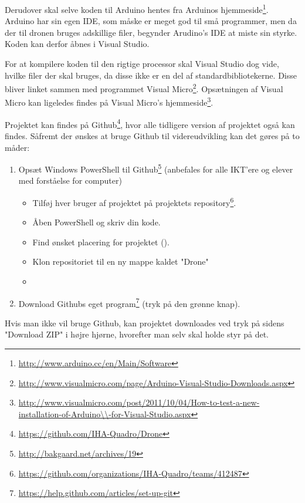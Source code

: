 \documentclass[Main]{subfiles}
\begin{document}
Derudover skal selve koden til Arduino hentes fra Arduinos hjemmeside\footnote{\url{http://www.arduino.cc/en/Main/Software}}.
Arduino har sin egen IDE, som måske er meget god til små programmer, men da der til dronen bruges adskillige filer, begynder Arudino's IDE at miste sin styrke.
Koden kan derfor åbnes i Visual Studio.

For at kompilere koden til den rigtige processor skal Visual Studio dog vide, hvilke filer der skal bruges, da disse ikke er en del af standardbibliotekerne.
Disse bliver linket sammen med programmet Visual Micro\footnote{\url{http://www.visualmicro.com/page/Arduino-Visual-Studio-Downloads.aspx}}.
Opsætningen af Visual Micro kan ligeledes findes på Visual Micro's hjemmeside\footnote{\url{http://www.visualmicro.com/post/2011/10/04/How-to-test-a-new-installation-of-Arduino\\-for-Visual-Studio.aspx}}.

Projektet kan findes på Github\footnote{\url{https://github.com/IHA-Quadro/Drone}}, hvor alle tidligere version af projektet også kan findes.
Såfremt der ønskes at bruge Github til videreudvikling kan det gøres på to måder:

\begin{enumerate}
\item Opsæt Windows PowerShell til Github\footnote{\url{http://bakgaard.net/archives/19}} (anbefales for alle IKT'ere og elever med forståelse for computer)
	\begin{itemize}
	\item Tilføj hver bruger af projektet på projektets repository\footnote{\url{https://github.com/organizations/IHA-Quadro/teams/412487}}.
	\item Åben PowerShell og skriv din kode.
	\item Find ønsket placering for projektet ().
	\item Klon repositoriet til en ny mappe kaldet "Drone" 
	\item[] 
	\end{itemize}
\item Download Githubs eget program\footnote{\url{https://help.github.com/articles/set-up-git}} (tryk på den grønne knap).
\end{enumerate}

Hvis man ikke vil bruge Github, kan projektet downloades ved tryk på sidens "Download ZIP" i højre hjørne, hvorefter man selv skal holde styr på det.
\end{document}
